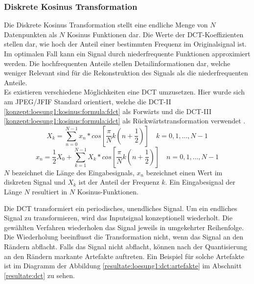 \subsubsection{Diskrete Kosinus Transformation} \label{konzept:loesung1:kosinus}
Die Diskrete Kosinus Transformation stellt eine endliche Menge von $N$ Datenpunkten als $N$ Kosinus Funktionen dar. Die Werte der DCT-Koeffizienten stellen dar, wie hoch der Anteil einer bestimmten Frequenz im Originalsignal ist. Im optimalen Fall kann ein Signal durch niederfrequente Funktionen approximiert werden. Die hochfrequenten Anteile stellen Detailinformationen dar, welche weniger Relevant sind für die Rekonstruktion des Signals als die niederfrequenten Anteile.\\
Es existieren verschiedene Möglichkeiten eine DCT umzusetzen. Hier wurde sich am JPEG/JFIF Standard orientiert, welche die DCT-II \eqref{konzept:loesung1:kosinus:formula:fdct} als Forwärts und die DCT-III \eqref{konzept:loesung1:kosinus:formula:idct} als Rückwärtstransformation verwendet \cite{wallace1992jpeg}. 
\begin{equation} \label{konzept:loesung1:kosinus:formula:fdct}
	X_k = \sum_{n=0}^{N-1}x_n*cos[\frac{\pi}{N}k(n+\frac{1}{2})] \quad k = 0, 1, \ldots, N-1
\end{equation}
\begin{equation} \label{konzept:loesung1:kosinus:formula:idct}
x_n  = \frac{1}{2}X_0 + \sum_{k=1}^{N-1}X_k*cos[\frac{\pi}{N}k(n+\frac{1}{2})] \quad n = 0,1,\ldots,N-1
\end{equation}
$N$ bezeichnet die Länge des Eingabesignals, $x_n$ bezeichnet einen Wert im diskreten Signal und $X_k$ ist der Anteil der Frequenz $k$. Ein Eingabesignal der Länge $N$ resultiert in $N$ Kosinus-Funktionen.

Die DCT transformiert ein periodisches, unendliches Signal. Um ein endliches Signal zu transformieren, wird das Inputsignal konzeptionell wiederholt. Die gewählten Verfahren wiederholen das Signal jeweils in umgekehrter Reihenfolge. Die Wiederholung beeinflusst die Transformation nicht, wenn das Signal an den Rändern abflacht. Falls das Signal nicht abflacht, können nach der Quantisierung an den Rändern markante Artefakte auftreten. Ein Beispiel für solche Artefakte ist im Diagramm der Abbildung \ref{resultate:loesung1:dct:artefakte} im Abschnitt \ref{resultate:dct} zu sehen.

